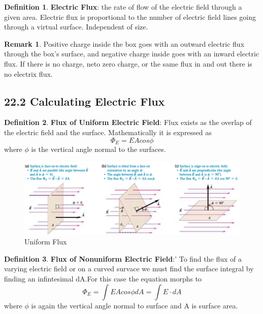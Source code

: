 \documentclass[12pt]{amsart}
\theoremstyle{definition}
\newtheorem{definition}{Definition} %
\newtheorem*{remark}{Remark}        %
\numberwithin{equation}{theorem}    %
\begin{document}
\begin{definition}
    \textbf{Electric Flux}: 
    the rate of flow of the electric field through 
    a given area. Electric flux is proportional to the number of 
    electric field lines going through a virtual surface. Independent of size.

    \begin{remark}
        Positive charge inside the box goes with an outward electric flux 
        through the box’s surface, and negative charge inside goes with an 
        inward electric flux. If there is no charge, neto zero charge, or the 
        same flux in and out there is no electrix flux. 
    \end{remark}
\end{definition}

\subsection*{22.2 Calculating Electric Flux}

\begin{definition}
    \textbf{Flux of Uniform Electric Field}:
    Flux exists as the overlap of the
    electric field and the surface. Mathematically it is expressed as 
    $$\Phi_E = EAcos\phi$$ where $\phi$ is the vertical angle normal to the surfaces.
\end{definition}

\begin{figure}[H]
    \centering
    \includegraphics[width=5in]{Media/Uniformflux.png}
    \caption{Uniform Flux}
    \label{Uniform Flux}
\end{figure}

\begin{definition}
    \textbf{Flux of Nonuniform Electric Field}:'
    To find the flux of a varying electric field or on a curved survace we must
    find the surface integral by finding an infintesimal dA.For this case the 
    equation morphs to $$\Phi_E = \int EAcos\phi dA = \int E \cdot dA$$ where 
    $\phi$ is again the vertical angle normal to surface and A is surface area.
\end{definition}
\end{document}
